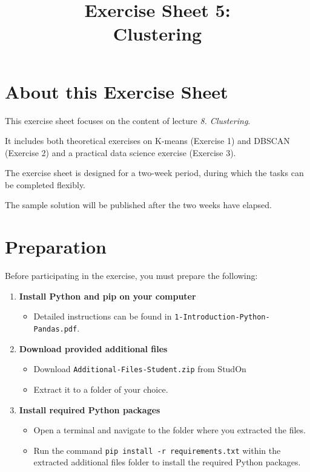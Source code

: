 \documentclass[
english,
smallborders
]{i6prcsht}
\begin{document}
\title{Exercise Sheet 5: \\ Clustering}
\maketitle
\vspace*{-2cm}

\section*{About this Exercise Sheet}

This exercise sheet focuses on the content of lecture \textit{8. Clustering}.

It includes both theoretical exercises on K-means (Exercise 1) and DBSCAN (Exercise 2) and a practical data science exercise (Exercise 3).

The exercise sheet is designed for a two-week period, during which the tasks can be completed flexibly.

The sample solution will be published after the two weeks have elapsed.

\section*{Preparation}

Before participating in the exercise, you must prepare the following:

\begin{enumerate}
	\item \textbf{Install Python and pip on your computer}

	      \begin{itemize}
		      \item Detailed instructions can be found in \texttt{1-Introduction-Python-Pandas.pdf}.
	      \end{itemize}

	\item \textbf{Download provided additional files}

	      \begin{itemize}
		      \item Download \texttt{Additional-Files-Student.zip} from StudOn
		      \item Extract it to a folder of your choice.
	      \end{itemize}

	\item \textbf{Install required Python packages}

	      \begin{itemize}
		      \item Open a terminal and navigate to the folder where you extracted the files.
		      \item Run the command \texttt{pip install -r requirements.txt} within the extracted additional files folder to install the required Python packages.
	      \end{itemize}


\end{enumerate}
\end{document}
